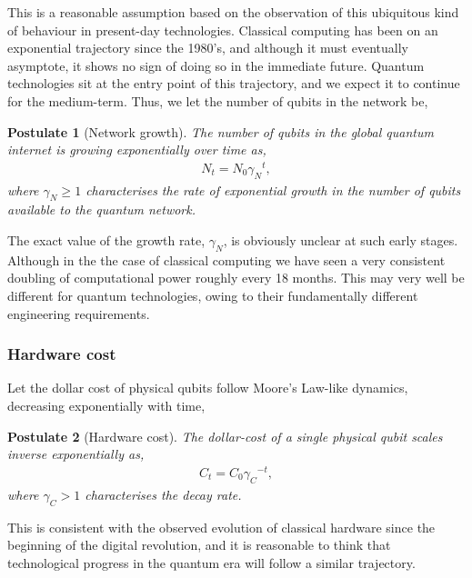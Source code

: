 \documentclass[aps, rmp, twocolumn, amsmath, amssymb, nofootinbib, superscriptaddress, longbibliography, floatfix, table-of-contents, eqsecnum]{revtex4-1}
\newtheorem{postulate}{Postulate}
\begin{document}
This is a reasonable assumption based on the observation of this ubiquitous kind of behaviour in present-day technologies. Classical computing has been on an exponential trajectory since the 1980's, and although it must eventually asymptote, it shows no sign of doing so in the immediate future. Quantum technologies sit at the entry point of this trajectory, and we expect it to continue for the medium-term. Thus, we let the number of qubits in the network be,
\begin{postulate}[Network growth]\label{post:net_growth}
The number of qubits in the global quantum internet is growing exponentially over time as,
\begin{align}
	N_t = N_0 {\gamma_N}^{t},
\end{align}
where \mbox{$\gamma_N\geq 1$} characterises the rate of exponential growth in the number of qubits available to the quantum network.
\end{postulate}

The exact value of the growth rate, $\gamma_N$, is obviously unclear at such early stages. Although in the the case of classical computing we have seen a very consistent doubling of computational power roughly every 18 months. This may very well be different for quantum technologies, owing to their fundamentally different engineering requirements.

%
%

\subsubsection{Hardware cost} 

Let the dollar cost of physical qubits follow Moore's Law-like dynamics, decreasing exponentially with time,
\begin{postulate}[Hardware cost]\label{post:hardware_cost}
The dollar-cost of a single physical qubit scales inverse exponentially as,
\begin{align}
	C_t = C_0 {\gamma_C}^{-t},
\end{align}
where \mbox{$\gamma_C>1$} characterises the decay rate.
\end{postulate}

This is consistent with the observed evolution of classical hardware since the beginning of the digital revolution, and it is reasonable to think that technological progress in the quantum era will follow a similar trajectory.
\end{document}
